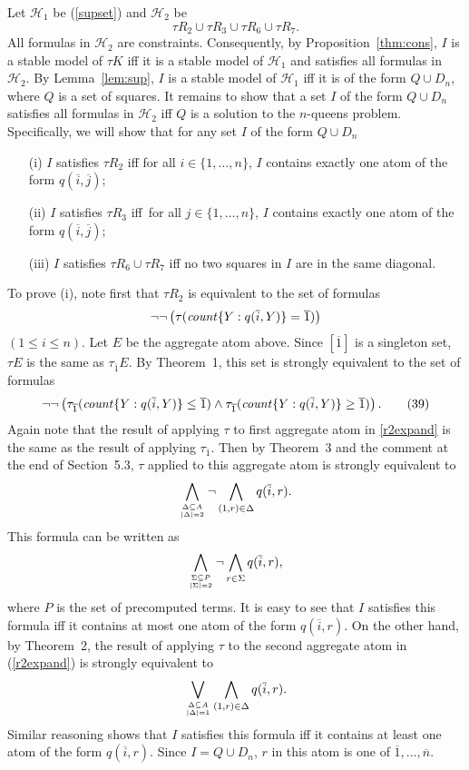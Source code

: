\documentclass{tlp}
\def\o{\overline}
\def\beq{\begin{equation}}
\def\eeq#1{\label{#1}\end{equation}}
\def\i#1{\hbox{\it #1\/}}
\begin{document}
\begin{proof*}
Let $\mathcal{H}_1$ be (\ref{supset}) and $\mathcal{H}_2$ be
$$
\tau R_2 \cup \tau R_3 \cup \tau R_6 \cup \tau R_7.
$$
All formulas in $\mathcal{H}_2$ are constraints. Consequently,
by Proposition~\ref{thm:cons}, $I$ is a stable
model of $\tau K$ iff it is a stable model of $\mathcal{H}_1$ and satisfies all formulas in $\mathcal{H}_2$.
By Lemma~\ref{lem:sup}, $I$ is a stable model of $\mathcal{H}_1$ iff it is
of the form $Q \cup D_n$, where $Q$ is a set of squares. It remains to show
that a set $I$ of the form $Q \cup D_n$ satisfies all formulas in
$\mathcal{H}_2$ iff $Q$ is a solution to the $n$-queens problem.
Specifically, we will show that for any set $I$ of the form $Q \cup D_n$
\begin{itemize}
\item[(i)] $I$ satisfies $\tau R_2$ iff for all $i \in \{1,\dots,n\}$, $I$
contains exactly one atom of the form $q(\o i, \o j)$;
\item[(ii)] $I$ satisfies $\tau R_3$ iff~for all $j \in \{1,\dots,n\}$, $I$
contains exactly one atom of the form $q(\o i, \o j)$;
\item[(iii)] $I$ satisfies $\tau R_6 \cup \tau R_7$ iff no two squares in $I$
are in the same diagonal.
\end{itemize}

To prove (i), note first that $\tau R_2$ is equivalent to  the set of formulas
$$
\neg \neg \left (\tau(\i{count}\{Y: q(\o i,Y)\} = \o 1) \right )
$$
$(1 \leq i \leq n)$. Let $E$ be the aggregate atom above. Since $[\o 1]$ is a
singleton set, $\tau E$ is the same as $\tau_{\o 1} E$. By Theorem~1, this set is strongly
equivalent to the set of formulas
\[
\neg \neg \left (\tau_{\o 1}(\i{count}\{Y:
  q(\o i,Y)\} \leq \o 1) \land \tau_{\o 1}(\i{count}\{Y: q(\o i,Y)\} \geq \o 1)
  \right ).
\tag{39}
\label{r2expand}
\]
Again note that the result of applying $\tau$ to first aggregate atom in \eqref{r2expand}
is the same as the result of applying $\tau_{\o 1}$.
Then by Theorem~3 and the comment at the end of Section~5.3,
$\tau$ applied to this
aggregate atom is strongly equivalent to
$$
\bigwedge_{\Delta \subseteq A \atop \lvert \Delta \rvert = 2} \neg
  \bigwedge_{(1, r) \in \Delta} q(\o i, r).
$$
This formula can be written as
$$
\bigwedge_{\Sigma \subseteq P \atop \lvert \Sigma \rvert = 2} \neg
  \bigwedge_{r \in \Sigma} q(\o i, r),
$$
where $P$ is the set of precomputed terms.
It is easy to see that $I$ satisfies this formula iff it contains at most
one atom of the form  $q(\o i,r)$. On the other hand, by Theorem~2,
the result of applying $\tau$ to the second aggregate atom in (\ref{r2expand})
is strongly equivalent to
$$
  \bigvee_{\Delta \subseteq A \atop \lvert \Delta \rvert = 1}
  \bigwedge_{(1, r) \in\Delta} q(\o i, r).
$$
Similar reasoning shows that $I$ satisfies this formula iff it
contains at least
one atom of the form  $q(\o i,r)$. Since $I = Q \cup D_n$,
$r$ in this atom is one of $\o 1,\dots, \o n$.


\end{proof*}
\end{document}
